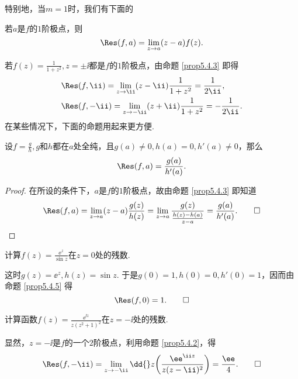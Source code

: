 特别地，当$m=1$时，我们有下面的
\begin{prop}\label{prop5.4.3}
若$a$是$f$的$1$阶极点，则
\[\Res(f,a)=\lim_{z\to a}(z-a)f(z).\]
\end{prop}

\begin{example}\label{exam5.4.4}
若$f(z)=\frac1{1+z^2},z=\pm\ii$都是$f$的$1$阶极点，由命题 \ref{prop5.4.3} 即得
\begin{align*}
&\Res(f,\ii)=\lim_{z\to \ii}(z-\ii)\frac1{1+z^2}=\frac1{2\ii},\\
&\Res(f,-\ii)=\lim_{z\to-\ii}(z+\ii)\frac1{1+z^2}=-\frac1{2\ii}.
\end{align*}
在某些情况下，下面的命题用起来更方便.
\end{example}

\begin{prop}\label{prop5.4.5}
设$f=\frac gh,g$和$h$都在$a$处全纯，且$g(a)\ne0,h(a)=0,h'(a)\ne0$，那么
\[\Res(f,a)=\frac{g(a)}{h'(a)}.\]
\end{prop}
\begin{proof}
在所设的条件下，$a$是$f$的$1$阶极点，故由命题 \ref{prop5.4.3} 即知道
\begin{equation*}
  \Res(f,a) = \lim_{z\to a}(z-a)\frac{g(z)}{h(z)}
  = \lim_{z\to a}\frac{g(z)}{\frac{h(z)-h(a)}{z-a}} = \frac{g(a)}{h'(a)}. \qedhere
\end{equation*}
\end{proof}

\begin{example}\label{exam5.4.6}
计算$f(z)=\frac{\ee^z}{\sin z}$在$z=0$处的残数.
\end{example}
\begin{solution}
这时$g(z)=\ee^z,h(z)=\sin z$. 于是$g(0)=1,h(0)=0,h'(0)=1$，因而由命题 \ref{prop5.4.5} 得
\begin{equation*}
  \Res(f,0) = 1. \qedhere
\end{equation*}
\end{solution}

\begin{example}
计算函数$f(z)=\frac{\ee^{\ii z}}{z(z^2+1)^2}$在$z=-\ii$处的残数.
\end{example}
\begin{solution}
  显然，$z=-\ii$是$f$的一个$2$阶极点，利用命题 \ref{prop5.4.2}，得
  \begin{equation*}
    \Res(f,-\ii)=\lim_{z\to-\ii}\dd{}z\bigg(\frac{\ee^{\ii z}}{z(z-\ii)^2}\bigg)
    = \frac{\ee}4. \qedhere
  \end{equation*}
\end{solution}

